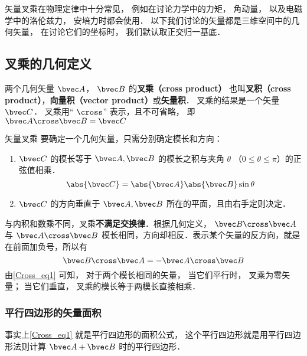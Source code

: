 

矢量叉乘在物理定律中十分常见， 例如在讨论力学中的力矩， 角动量， 以及电磁学中的洛伦兹力， 安培力时都会使用． 以下我们讨论的矢量都是三维空间中的几何矢量， 在讨论它们的坐标时， 我们默认取正交归一基底．

\subsection{叉乘的几何定义}
两个几何矢量 $\bvec A$，  $\bvec B$ 的\textbf{叉乘（cross product）} 也叫\textbf{叉积（cross product）}，\textbf{向量积（vector product）}或\textbf{矢量积}． 叉乘的结果是一个矢量 $\bvec C$．  叉乘用“ $\cross$” 表示，且不可省略， 即 $ \bvec A \cross \bvec B = \bvec C$

\begin{definition}{矢量叉乘}\label{Cross_def1}
要确定一个几何矢量，只需分别确定模长和方向：
\begin{enumerate}
\item $\bvec C$ 的模长等于 $\bvec A, \bvec B$ 的模长之积与夹角 $\theta$ （$0 \leqslant \theta \leqslant \pi$）的正弦值相乘．
\begin{equation}\label{Cross_eq1}
\abs{\bvec C}  = \abs{\bvec A} \abs{\bvec B} \sin\theta 
\end{equation}
\item $\bvec C$ 的方向垂直于 $\bvec A, \bvec B$ 所在的平面，且由右手定则决定．
\end{enumerate}
\end{definition}

与内积和数乘不同，叉乘\textbf{不满足交换律}．根据几何定义， $\bvec B \cross \bvec A$ 与 $\bvec A \cross \bvec B$ 模长相同，方向却相反．表示某个矢量的反方向，就是在前面加负号，所以有
\begin{equation}\label{Cross_eq11}
\bvec B \cross \bvec A = -\bvec A \cross \bvec B
\end{equation}
由\autoref{Cross_eq1} 可知， 对于两个模长相同的矢量， 当它们平行时， 叉乘为零矢量； 当它们垂直， 叉乘的模长等于两模长直接相乘．

\subsubsection{平行四边形的矢量面积}
事实上\autoref{Cross_eq1} 就是平行四边形的面积公式， 这个平行四边形就是用平行四边形法则计算 $\bvec A + \bvec B$ 时的平行四边形．

